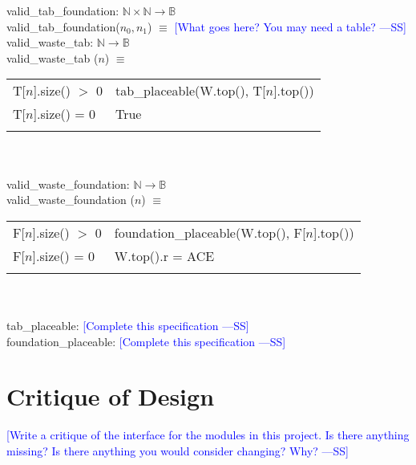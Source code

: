 \documentclass[12pt]{article}
\newcommand{\authornote}[3]{\textcolor{#1}{[#3 ---#2]}}
\newcommand{\authornote}[3]{}
\newcommand{\wss}[1]{\authornote{blue}{SS}{#1}}
\begin{document}
\noindent valid\_tab\_foundation: $\mathbb{N} \times \mathbb{N} \rightarrow \mathbb{B}$\\
\noindent valid\_tab\_foundation($n_0, n_1$) $\equiv$ \wss{What goes here?  You
  may need a table?}\\

\noindent valid\_waste\_tab: $\mathbb{N} \rightarrow \mathbb{B}$\\
\noindent valid\_waste\_tab ($n$) $\equiv$

\begin{tabular}{|p{4cm}|l|}
\hhline{|-|-|}
T[$n$].size() $>$ 0 & tab\_placeable(W.top(), T[$n$].top())\\
\hhline{|-|-|}
T[$n$].size() = 0 & True\\
\hhline{|-|-|}
\end{tabular}\\\\

\noindent valid\_waste\_foundation: $\mathbb{N} \rightarrow \mathbb{B}$\\
\noindent valid\_waste\_foundation ($n$) $\equiv$

\begin{tabular}{|p{4cm}|l|}
\hhline{|-|-|}
F[$n$].size() $>$ 0 & foundation\_placeable(W.top(), F[$n$].top())\\
\hhline{|-|-|}
F[$n$].size() = 0 & W.top().r = ACE\\
\hhline{|-|-|}
\end{tabular}\\\\

\noindent tab\_placeable: \wss{Complete this specification}\\

\noindent foundation\_placeable: \wss{Complete this specification}

\newpage

\section*{Critique of Design}

\wss{Write a critique of the interface for the modules in this project.  Is there
anything missing?  Is there anything you would consider changing?  Why?}\\
\end{document}
